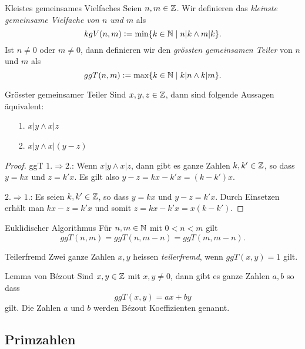 \begin{definition}{Kleistes gemeinsames Vielfaches}
    Seien $n,m\in\mathbb{Z}$. Wir definieren das \textit{kleinste gemeinsame Vielfache von $n$ und $m$} als
    \[
        kgV(n,m):=\min\{k\in\mathbb{N}\mid n|k\wedge m|k\}.
    \]
    Ist $n\neq0$ oder $ m\neq 0$, dann definieren wir den \textit{grössten gemeinsamen Teiler} von $n$ und $m$ als
    \[
        ggT(n,m):=\max\{k\in\mathbb{N}\mid k|n\wedge k|m\}.
    \]
\end{definition}

\begin{lemma}{Grösster gemeinsamer Teiler}
    Sind $x,y,z\in\mathbb{Z}$, dann sind folgende Aussagen äquivalent:
    \begin{enumerate}
        \item[1.] $ x|y\wedge x|z$
        \item[2.] $x|y\wedge x|(y-z) $
    \end{enumerate}
\end{lemma}

\begin{proof}{ggT}
    $1.\Rightarrow 2.$: Wenn $x|y\wedge x|z$, dann gibt es ganze Zahlen $k,k'\in\mathbb{Z}$, so dass $y=kx$ und $z=k'x$. Es gilt also $y-z=kx-k'x=(k-k')x$.

    $2.\Rightarrow 1.$: Es seien $k,k'\in\mathbb{Z}$, so dass $y=kx$ und $y-z=k'x$. Durch Einsetzen erhält man $ kx-z=k'x $ und somit $z=kx-k'x=x(k-k')$.
\end{proof}

\begin{lemma}{Euklidischer Algorithmus}
    Für $n,m\in\mathbb{N}$ mit $0<n< m$ gilt
    \[
        ggT(n,m)=ggT(n,m-n)=ggT(m,m-n).
    \]
\end{lemma}

\begin{definition}{Teilerfremd}
    Zwei ganze Zahlen $x,y$ heissen \textit{teilerfremd}, wenn $ggT(x,y)=1$ gilt.
\end{definition}

\begin{theorem}{Lemma von Bézout}
    Sind $x,y\in\mathbb{Z}$ mit $x,y\neq 0$, dann gibt es ganze Zahlen $a,b$ so dass
    \[
        ggT(x,y)=ax+by
    \]
    gilt. Die Zahlen $a$ und $b$ werden Bézout Koeffizienten genannt.
\end{theorem}

\subsection{Primzahlen}

